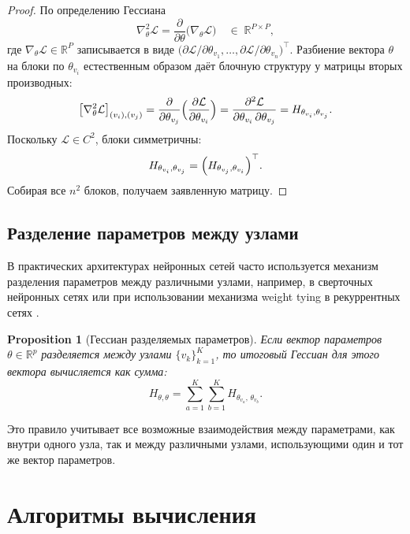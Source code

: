 \documentclass[11pt]{article}
\newtheorem{proposition}{Proposition}
\begin{document}
\begin{proof}
  По определению Гессиана
  \[
    \nabla^2_\theta \mathcal L
    = \frac{\partial}{\partial\theta}
    \bigl(\nabla_\theta \mathcal L\bigr)
    \quad\in\;\mathbb R^{P\times P},
  \]
  где $\nabla_\theta \mathcal L\in\mathbb R^P$ записывается в виде
  \(\bigl(\partial \mathcal L/\partial\theta_{v_1}, \ldots,
  \partial \mathcal L/\partial\theta_{v_n}\bigr)^\top\).
  Разбиение вектора $\theta$ на блоки по $\theta_{v_i}$ естественным образом
  даёт блочную структуру у матрицы вторых производных:
  \[
    \bigl[\nabla^2_\theta\mathcal L\bigr]_{(v_i),(v_j)}
    = \frac{\partial}{\partial\theta_{v_j}}
    \Bigl(\frac{\partial \mathcal L}{\partial\theta_{v_i}}\Bigr)
    = \frac{\partial^2 \mathcal L}{\partial\theta_{v_i}\,\partial\theta_{v_j}}
    = H_{\theta_{v_i},\theta_{v_j}}.
  \]
  Поскольку $\mathcal L\in C^2$, блоки симметричны:
  \[
    H_{\theta_{v_i},\theta_{v_j}}
    = \Bigl(H_{\theta_{v_j},\theta_{v_i}}\Bigr)^\top.
  \]
  Собирая все $n^2$ блоков, получаем заявленную матрицу.
\end{proof}

\subsection{Разделение параметров между узлами}

В практических архитектурах нейронных сетей часто используется механизм разделения параметров между
различными узлами, например, в сверточных нейронных сетях или при использовании механизма weight tying в
рекуррентных сетях \citep{pascanu2013difficulty}.

\begin{proposition}[Гессиан разделяемых параметров]
  Если вектор параметров $\theta\in\mathbb{R}^p$ разделяется между узлами $\{v_k\}_{k=1}^K$, то итоговый
  Гессиан для этого вектора вычисляется как сумма:
  \[
    H_{\theta,\theta}
    = \sum_{a=1}^K\sum_{b=1}^K
    H_{\theta_{v_a},\,\theta_{v_b}}.
  \]
\end{proposition}

Это правило учитывает все возможные взаимодействия между параметрами, как внутри одного узла, так и между
различными узлами, использующими один и тот же вектор параметров.

\newpage

\section{Алгоритмы вычисления}
\end{document}
